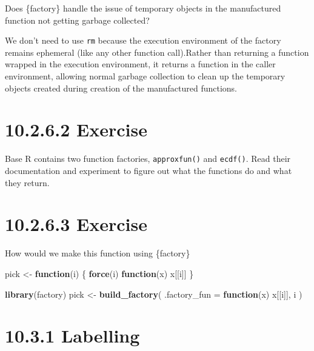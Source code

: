 \documentclass[]{book}
\newenvironment{Shaded}{\begin{snugshade}}{\end{snugshade}}
\newcommand{\ControlFlowTok}[1]{\textcolor[rgb]{0.13,0.29,0.53}{\textbf{#1}}}
\newcommand{\DataTypeTok}[1]{\textcolor[rgb]{0.13,0.29,0.53}{#1}}
\newcommand{\KeywordTok}[1]{\textcolor[rgb]{0.13,0.29,0.53}{\textbf{#1}}}
\newcommand{\NormalTok}[1]{#1}
\newcommand{\StringTok}[1]{\textcolor[rgb]{0.31,0.60,0.02}{#1}}
\begin{document}
Does \{factory\} handle the issue of temporary objects in the manufactured function not getting garbage collected?

We don't need to use \texttt{rm} because the execution environment of the factory remains ephemeral (like any other function call).Rather than returning a function wrapped in the execution environment, it returns a function in the caller environment, allowing normal garbage collection to clean up the temporary objects created during creation of the manufactured functions.

\hypertarget{exercise-13}{%
\section*{10.2.6.2 Exercise}\label{exercise-13}}

Base R contains two function factories, \texttt{approxfun()} and \texttt{ecdf()}. Read their documentation and experiment to figure out what the functions do and what they return.

\hypertarget{exercise-14}{%
\section*{10.2.6.3 Exercise}\label{exercise-14}}

How would we make this function using \{factory\}

\begin{Shaded}
\begin{Highlighting}[]
\NormalTok{pick <-}\StringTok{ }\ControlFlowTok{function}\NormalTok{(i) \{}
  \KeywordTok{force}\NormalTok{(i)}
  \ControlFlowTok{function}\NormalTok{(x) x[[i]]}
\NormalTok{\}}
\end{Highlighting}
\end{Shaded}

\begin{Shaded}
\begin{Highlighting}[]
\KeywordTok{library}\NormalTok{(factory)}
\NormalTok{pick <-}\StringTok{ }\KeywordTok{build_factory}\NormalTok{(}
  \DataTypeTok{.factory_fun =} \ControlFlowTok{function}\NormalTok{(x) x[[i]],}
\NormalTok{  i}
\NormalTok{)}
\end{Highlighting}
\end{Shaded}

\hypertarget{labelling}{%
\section*{10.3.1 Labelling}\label{labelling}}
\end{document}
